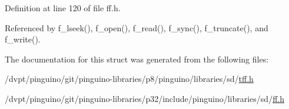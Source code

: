 Definition at line 120 of file ff.\-h.



Referenced by f\-\_\-lseek(), f\-\_\-open(), f\-\_\-read(), f\-\_\-sync(), f\-\_\-truncate(), and f\-\_\-write().



The documentation for this struct was generated from the following files\-:\begin{DoxyCompactItemize}
\item 
/dvpt/pinguino/git/pinguino-\/libraries/p8/pinguino/libraries/sd/\hyperlink{tff_8h}{tff.\-h}\item 
/dvpt/pinguino/git/pinguino-\/libraries/p32/include/pinguino/libraries/sd/\hyperlink{ff_8h}{ff.\-h}\end{DoxyCompactItemize}
